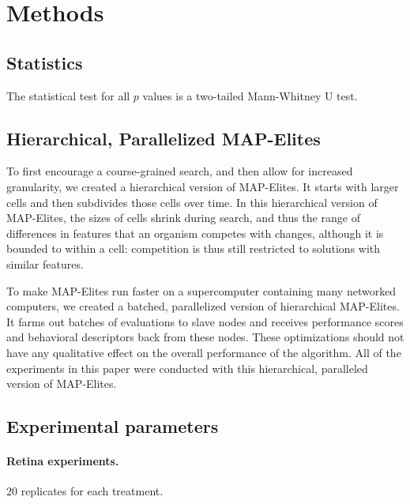 \documentclass[twocolumn, DIV25, 9pt]{scrartcl}
\begin{document}
\section{Methods}

\subsection{Statistics}

The statistical test for all $p$ values is a two-tailed Mann-Whitney U test. 

\subsection{Hierarchical, Parallelized MAP-Elites}
\label{hierarchicalVersion}

To first encourage a course-grained search, and then allow for increased granularity, we created a hierarchical version of MAP-Elites. It starts with larger cells and then subdivides those cells over time. 
%
In this hierarchical version of MAP-Elites, the sizes of cells shrink during search, and thus the range of differences in features that an organism competes with changes, although it is bounded to within a cell: competition is thus still restricted to solutions with similar features. 

To make MAP-Elites run faster on a supercomputer containing many networked computers, we created a batched, parallelized version of hierarchical MAP-Elites. It farms out batches of evaluations to slave nodes and receives performance scores and behavioral descriptors back from these nodes. These optimizations should not have any qualitative effect on the overall performance of the algorithm. All of the experiments in this paper were conducted with this hierarchical, paralleled version of MAP-Elites. 

%
%
%
%
%
%
%
%
%
%
%
%
%
%
%
%
%
%
%
%
%
%
%
%
%
%
%
%
%
%

%
%
%
%
%
%
%
%
%
%
%
%
%
%
%
%
%
%
%
%
%
%
%
%
%
%
%
%
%
%
%
%
%
%
%
%
%

\subsection{Experimental parameters}

\paragraph{Retina experiments.}
20 replicates for each treatment.
\end{document}
